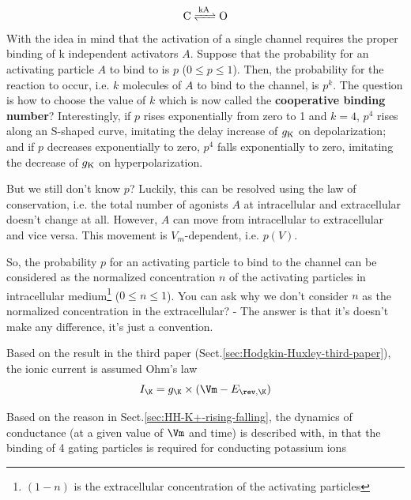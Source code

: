 \begin{mdframed}

\begin{eqnarray}
  \label{eq:555}
  \ce{C <=>[kA][] O}
\end{eqnarray}
With the idea in mind that the activation of a single  channel
requires the proper binding of k independent activators $A$. Suppose
that the probability for an activating particle $A$ to bind to is $p$
($0\le p \le 1$). Then, the probability for the reaction to occur,
i.e. $k$ molecules of $A$ to bind to the channel, is $p^k$. The
question is how to choose the value of $k$ which is now called the
{\bf cooperative binding number}?  Interestingly, if $p$ rises
exponentially from zero to 1 and $k=4$, $p^4$ rises along an S-shaped
curve, imitating the delay increase of $g_{\ce{K}}$ on depolarization;
and if $p$ decreases exponentially to zero, $p^4$ falls exponentially
to zero, imitating the decrease of $g_{\ce{K}}$ on hyperpolarization.

But we still don't know $p$? Luckily, this can be resolved using the
law of conservation, i.e. the total number of agonists $A$ at
intracellular and extracellular doesn't change at all. However, $A$
can move from intracellular to extracellular and vice versa. This
movement is $V_m$-dependent, i.e. $p(V)$.

So, the probability $p$ for an activating particle to bind to the
channel can be considered as the normalized concentration $n$ of the
activating particles in intracellular
medium\footnote{$(1-n)$ is the extracellular concentration of the
  activating particles}
($0\le n \le 1$).  You can ask why we don't consider $n$ as the
normalized concentration in the extracellular? - The answer is that
it's doesn't make any difference, it's just a convention.

\end{mdframed}

Based on the result in the third paper
(Sect.\ref{sec:Hodgkin-Huxley-third-paper}), the ionic current is assumed Ohm's
law
\begin{equation}
I_{\K} = g_{\K} \times (\Vm - E_{\rev,\K})
\end{equation}

Based on the reason in Sect.\ref{sec:HH-K+-rising-falling}, the dynamics of
conductance (at a given value of $\Vm$ and time) is described with, in that the
binding of 4 gating particles is required for conducting potassium ions

